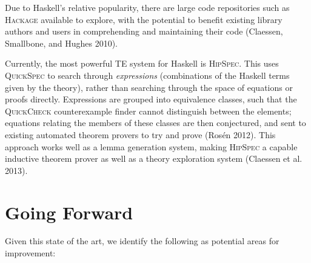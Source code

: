 \documentclass[]{article}
\begin{document}
Due to Haskell's relative popularity, there are large code repositories
such as \textsc{Hackage} available to explore, with the potential to
benefit existing library authors and users in comprehending and
maintaining their code (Claessen, Smallbone, and Hughes 2010).

Currently, the most powerful TE system for Haskell is \textsc{HipSpec}.
This uses \textsc{QuickSpec} to search through \emph{expressions}
(combinations of the Haskell terms given by the theory), rather than
searching through the space of equations or proofs directly. Expressions
are grouped into equivalence classes, such that the \textsc{QuickCheck}
counterexample finder cannot distinguish between the elements; equations
relating the members of these classes are then conjectured, and sent to
existing automated theorem provers to try and prove (Rosén 2012). This
approach works well as a lemma generation system, making
\textsc{HipSpec} a capable inductive theorem prover as well as a theory
exploration system (Claessen et al. 2013).

\section{Going Forward}\label{going-forward}

Given this state of the art, we identify the following as potential
areas for improvement:
\end{document}
